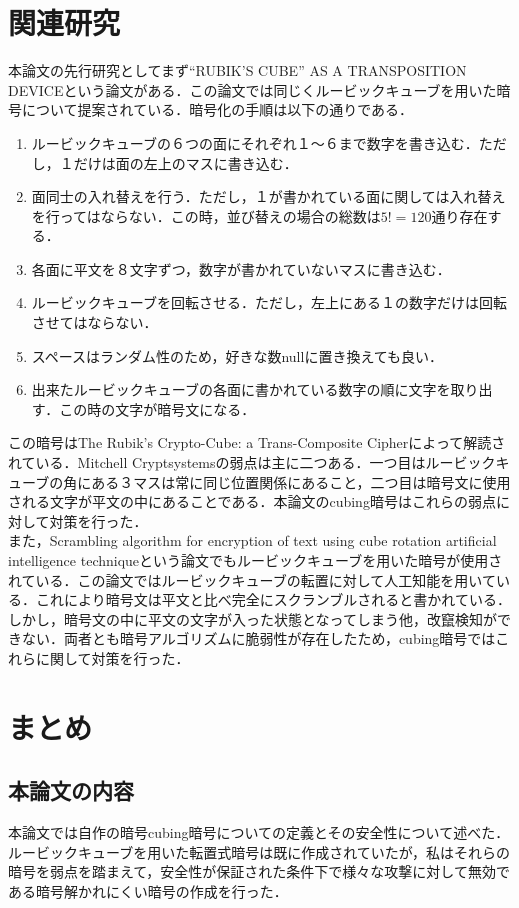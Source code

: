 \documentclass[titlepage]{jarticle}
\begin{document}
\section{関連研究}
本論文の先行研究としてまず“RUBIK'S CUBE” AS A TRANSPOSITION DEVICE\cite{Mitchell}という論文がある．この論文では同じくルービックキューブを用いた暗号について提案されている．暗号化の手順は以下の通りである．
\begin{enumerate}
  \item ルービックキューブの６つの面にそれぞれ１〜６まで数字を書き込む．ただし，１だけは面の左上のマスに書き込む．
  \item 面同士の入れ替えを行う．ただし，１が書かれている面に関しては入れ替えを行ってはならない．この時，並び替えの場合の総数は\(5!=120\)通り存在する．
  \item 各面に平文を８文字ずつ，数字が書かれていないマスに書き込む．
  \item ルービックキューブを回転させる．ただし，左上にある１の数字だけは回転させてはならない．
  \item スペースはランダム性のため，好きな数nullに置き換えても良い．
  \item 出来たルービックキューブの各面に書かれている数字の順に文字を取り出す．この時の文字が暗号文になる．
\end{enumerate}
この暗号はThe Rubik's Crypto-Cube: a Trans-Composite Cipher\cite{Trans-Composite Cipher}によって解読されている．Mitchell Cryptsystemsの弱点は主に二つある．一つ目はルービックキューブの角にある３マスは常に同じ位置関係にあること，二つ目は暗号文に使用される文字が平文の中にあることである．本論文のcubing暗号はこれらの弱点に対して対策を行った．\\
また，Scrambling algorithm for encryption of text using cube rotation artificial intelligence technique\cite{Scrambling algorithm}という論文でもルービックキューブを用いた暗号が使用されている．この論文ではルービックキューブの転置に対して人工知能を用いている．これにより暗号文は平文と比べ完全にスクランブルされると書かれている．しかし，暗号文の中に平文の文字が入った状態となってしまう他，改竄検知ができない．両者とも暗号アルゴリズムに脆弱性が存在したため，cubing暗号ではこれらに関して対策を行った．

\section{まとめ}

\subsection{本論文の内容}
本論文では自作の暗号cubing暗号についての定義とその安全性について述べた．ルービックキューブを用いた転置式暗号は既に作成されていたが，私はそれらの暗号を弱点を踏まえて，安全性が保証された条件下で様々な攻撃に対して無効である暗号解かれにくい暗号の作成を行った．
\end{document}
